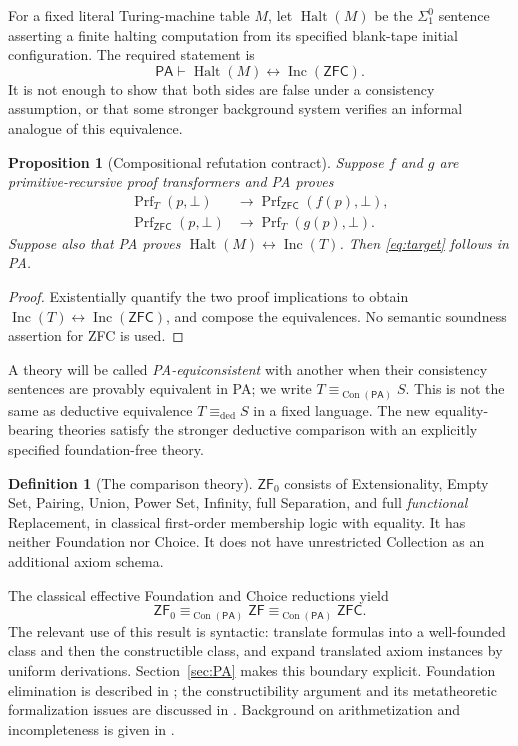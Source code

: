\documentclass[11pt,letterpaper]{article}
\newtheorem{proposition}[theorem]{Proposition}
\theoremstyle{definition}\newtheorem{definition}[theorem]{Definition}
\theoremstyle{remark}\newtheorem{remark}[theorem]{Remark}
\newcommand{\PA}{\mathsf{PA}}
\newcommand{\ZFC}{\mathsf{ZFC}}
\newcommand{\ZF}{\mathsf{ZF}}
\newcommand{\ZFz}{\mathsf{ZF}_{0}}
\newcommand{\Con}{\operatorname{Con}}
\newcommand{\Inc}{\operatorname{Inc}}
\newcommand{\Prf}{\operatorname{Prf}}
\newcommand{\Halt}{\operatorname{Halt}}
\newcommand{\eqpa}{\mathrel{\equiv_{\Con(\PA)}}}
\newcommand{\eqd}{\mathrel{\equiv_{\mathrm{ded}}}}
\begin{document}
For a fixed literal Turing-machine table $M$, let $\Halt(M)$ be the
$\Sigma^0_1$ sentence asserting a finite halting computation from its
specified blank-tape initial configuration. The required statement is
\begin{equation}\label{eq:target}
 \PA\vdash \Halt(M)\leftrightarrow\Inc(\ZFC).
\end{equation}
It is not enough to show that both sides are false under a consistency
assumption, or that some stronger background system verifies an informal
analogue of this equivalence.

\begin{proposition}[Compositional refutation contract]\label{prop:contract}
Suppose $f$ and $g$ are primitive-recursive proof transformers and PA proves
\begin{align*}
 \Prf_T(p,\bot)&\longrightarrow\Prf_{\ZFC}(f(p),\bot),\\
 \Prf_{\ZFC}(p,\bot)&\longrightarrow\Prf_T(g(p),\bot).
\end{align*}
Suppose also that PA proves $\Halt(M)\leftrightarrow\Inc(T)$.
Then \eqref{eq:target} follows in PA.
\end{proposition}
\begin{proof}
Existentially quantify the two proof implications to obtain
$\Inc(T)\leftrightarrow\Inc(\ZFC)$, and compose the equivalences.
No semantic soundness assertion for ZFC is used.
\end{proof}

A theory will be called \emph{PA-equiconsistent} with another when their
consistency sentences are provably equivalent in PA; we write $T\eqpa S$.
This is not the same as deductive equivalence $T\eqd S$ in a fixed language.
The new equality-bearing theories satisfy the stronger deductive
comparison with an explicitly specified foundation-free theory.

\begin{definition}[The comparison theory]\label{def:ZF0}
$\ZFz$ consists of Extensionality, Empty Set, Pairing, Union, Power Set,
Infinity, full Separation, and full \emph{functional} Replacement, in
classical first-order membership logic with equality. It has neither
Foundation nor Choice. It does not have unrestricted Collection as an
additional axiom schema.
\end{definition}

The classical effective Foundation and Choice reductions yield
\begin{equation}\label{eq:standard}
 \ZFz\eqpa\ZF\eqpa\ZFC.
\end{equation}
The relevant use of this result is syntactic: translate formulas into a
well-founded class and then the constructible class, and expand translated
axiom instances by uniform derivations. Section~\ref{sec:PA} makes this
boundary explicit. Foundation elimination is described in
\cite{avigad}; the constructibility argument and its metatheoretic
formalization issues are discussed in \cite{paulson}. Background on
arithmetization and incompleteness is given in \cite{buss}.
\end{document}
